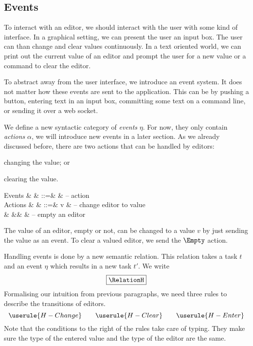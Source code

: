 \subsection{Events}

To interact with an editor,
we should interact with the user with some kind of interface.
In a graphical setting,
we can present the user an input box.
The user can than change and clear values continuously.
In a text oriented world,
we can print out the current value of an editor
and prompt the user for a new value
or a command to clear the editor.

To abstract away from the user interface,
we introduce an event system.
It does not matter how these events are sent to the application.
This can be by pushing a button,
entering text in an input box,
committing some text on a command line,
or sending it over a web socket.

We define a new syntactic category of \emph{events} $\eta$.
For now, they only contain \emph{actions} $\alpha$,
we will introduce new events in a later section.
As we already discussed before,
there are two actions that can be handled by editors:
\begin{enumerate*}
  \item changing the value; or
  \item clearing the value.
\end{enumerate*}
\begin{grammar}
  Events
    & \eta   & ::=& \alpha & – action \\
  Actions
    & \alpha & ::=& v      & – change editor to value \\
    &        &\mid& \Empty & – empty an editor \\
\end{grammar}
The value of an editor, empty or not, can be changed to a value $v$ by just sending the value as an event.
To clear a valued editor, we send the $\Empty$ action.

Handling events is done by a new semantic relation.
This relation takes a task $t$ and an event $\eta$ which results in a new task $t'$.
We write
\begin{equation*}
  \boxed{\RelationH}
\end{equation*}
Formalising our intuition from previous paragraphs,
we need three rules to describe the transitions of editors.
\begin{equation*}
  \userule{H-Change} \qquad \userule{H-Clear} \qquad \userule{H-Enter}
\end{equation*}
Note that the conditions to the right of the rules take care of typing.
They make sure the type of the entered value and the type of the editor are the same.


